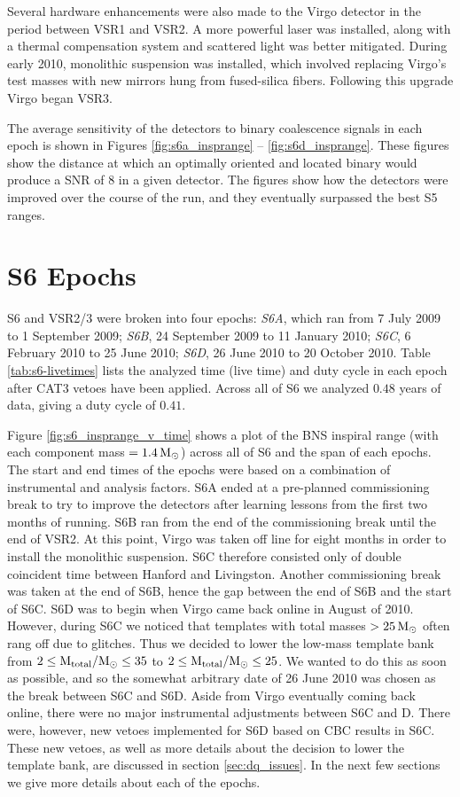 Several hardware enhancements were also made to the Virgo detector in the
period between \ac{VSR1} and \ac{VSR2}. A more powerful laser was installed,
along with a thermal compensation system and scattered light was better
mitigated. During early 2010, monolithic suspension was installed, which
involved replacing Virgo's test masses with new mirrors hung from fused-silica
fibers. Following this upgrade Virgo began \ac{VSR3}. 

The average sensitivity of the detectors to binary coalescence signals in each epoch is shown
in Figures \ref{fig:s6a_insprange} -- \ref{fig:s6d_insprange}. These figures show the distance at
which an optimally oriented and located binary would produce a \ac{SNR}
of $8$ in a given detector. The figures show how the detectors were improved over the course of the run, and they eventually surpassed the best \ac{S5} ranges. 

\section{S6 Epochs}

\ac{S6} and VSR2/3 were broken into four epochs: \emph{S6A}, which ran from 7 July 2009 to 1 September 2009; \emph{S6B}, 24 September 2009 to 11 January 2010; \emph{S6C}, 6 February 2010 to 25 June 2010; \emph{S6D}, 26 June 2010 to 20 October 2010. Table \ref{tab:s6-livetimes} lists the analyzed time (live time) and duty cycle in each epoch after CAT3 vetoes have been applied. Across all of S6 we analyzed $0.48$ years of data, giving a duty cycle of $0.41$.

Figure \ref{fig:s6_insprange_v_time} shows a plot of the \ac{BNS} inspiral range (with each component mass $= 1.4\,\mathrm{M_\odot}$) across all of \ac{S6} and the span of each epochs. The start and end times of the epochs were based on a combination of instrumental and analysis factors. S6A ended at a pre-planned commissioning break to try to improve the detectors after learning lessons from the first two months of running. S6B ran from the end of the commissioning break until the end of \ac{VSR2}. At this point, Virgo was taken off line for eight months in order to install the monolithic suspension. S6C therefore consisted only of double coincident time between Hanford and Livingston. Another commissioning break was taken at the end of S6B, hence the gap between the end of S6B and the start of S6C. S6D was to begin when Virgo came back online in August of 2010. However, during S6C we noticed that templates with total masses $> 25\,\mathrm{M_\odot}$ often rang off due to glitches. Thus we decided to lower the low-mass template bank from $2 \leq \mathrm{M_{total}}/\mathrm{M_\odot} \leq 35$ to $2 \leq \mathrm{M_{total}}/\mathrm{M_\odot} \leq 25$. We wanted to do this as soon as possible, and so the somewhat arbitrary date of 26 June 2010 was chosen as the break between S6C and S6D. Aside from Virgo eventually coming back online, there were no major instrumental adjustments between S6C and D. There were, however, new vetoes implemented for S6D based on \ac{CBC} results in S6C. These new vetoes, as well as more details about the decision to lower the template bank, are discussed in section \ref{sec:dq_issues}. In the next few sections we give more details about each of the epochs.

